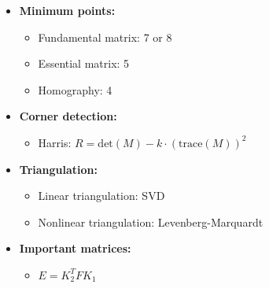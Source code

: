 \documentclass[a4paper,11pt]{article}
\begin{document}
\begin{itemize}
    \item \textbf{Minimum points:}
        \begin{itemize}
            \item Fundamental matrix: 7 or 8
            \item Essential matrix: 5
            \item Homography: 4
        \end{itemize}
    \item \textbf{Corner detection:}
        \begin{itemize}
            \item Harris: $R = \text{det}(M) - k \cdot (\text{trace}(M))^2$
        \end{itemize}
    \item \textbf{Triangulation:}
        \begin{itemize}
            \item Linear triangulation: SVD
            \item Nonlinear triangulation: Levenberg-Marquardt
        \end{itemize}
    \item \textbf{Important matrices:}
        \begin{itemize}
            \item $E = K_2^T F K_1$
        \end{itemize}
\end{itemize}
\end{document}
